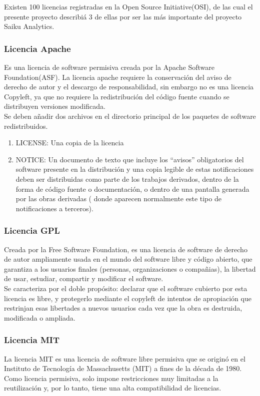 \begin{spacing}{1.5}
	Existen 100 licencias registradas en la Open Source Initiative(OSI), de las cual el presente proyecto describi\'{a} 3 de ellas por ser las m\'{a}s importante del proyecto Saiku Analytics.

	\subsubsection{Licencia Apache}
	Es una licencia de software permisiva creada por la Apache Software Foundation(ASF). La licencia apache requiere la conservación del aviso de derecho de autor y el descargo de responsabilidad, sin embargo no es una licencia Copyleft, ya que no requiere la redistribución del código fuente cuando se distribuyen versiones modificada.\\
	Se deben añadir dos archivos en el directorio principal de los paquetes de software redistribuidos.
	\begin{enumerate}
		\item LICENSE: Una copia de la licencia
		\item NOTICE: Un documento de texto que incluye los “avisos” obligatorios del software presente en la distribución y una copia legible de estas notificaciones deben ser distribuidas como parte de los trabajos derivados, dentro de la forma de código fuente o documentación, o dentro de una pantalla generada por las obras derivadas ( donde aparecen normalmente este tipo de notificaciones a terceros).
	\end{enumerate}			

	\subsubsection{Licencia GPL}
	Creada por la Free Software Foundation, es una licencia de software de derecho de autor ampliamente usada en el mundo del software libre y código abierto, que garantiza a los usuarios finales (personas, organizaciones o compañias), la libertad de usar, estudiar, compartir y modificar el software.\\
	Se caracteriza por el doble propósito: declarar que el software cubierto por esta licencia es libre, y protegerlo mediante el copyleft de intentos de apropiación que restrinjan esas libertades a nuevos usuarios cada vez que la obra es destruida, modificada o ampliada.

	\subsubsection{Licencia MIT}
	La licencia MIT es una licencia de software libre permisiva que se originó en el Instituto de Tecnología de Massachusetts (MIT) a fines de la década de 1980. Como licencia permisiva, solo impone restricciones muy limitadas a la reutilización y, por lo tanto, tiene una alta compatibilidad de licencias.\\
	

\end{spacing}
